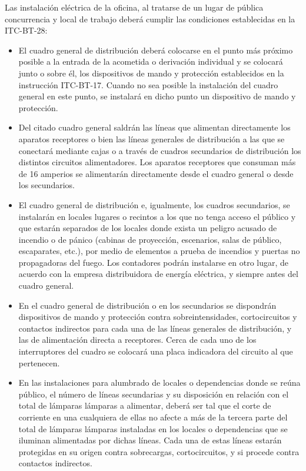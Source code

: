 Las instalación eléctrica de la oficina, al tratarse de un lugar de pública concurrencia y local de trabajo deberá cumplir las condiciones establecidas en la ITC-BT-28: \\

\begin{itemize}
\item El cuadro general de distribución deberá colocarse en el punto más próximo posible a la entrada de la acometida o derivación individual y se colocará junto o sobre él, los dispositivos de mando y protección establecidos en la instrucción ITC-BT-17. Cuando no sea posible la instalación del cuadro general en este punto, se instalará en dicho punto un dispositivo de mando y protección.\\

\item Del citado cuadro general saldrán las líneas que alimentan directamente los aparatos receptores o bien las líneas generales de distribución a las que se conectará mediante cajas o a través de cuadros secundarios de distribución los distintos circuitos alimentadores. Los aparatos receptores que consuman más de 16 amperios se alimentarán directamente desde el cuadro general o desde los secundarios.

\item El cuadro general de distribución e, igualmente, los cuadros secundarios, se instalarán en locales lugares o recintos a los que no tenga acceso el público y que estarán separados de los locales donde exista un peligro acusado de incendio o de pánico (cabinas de proyección, escenarios, salas de público, escaparates, etc.), por medio de elementos a prueba de incendios y puertas no propagadoras del fuego. Los contadores podrán instalarse en otro lugar, de acuerdo con la empresa distribuidora de energía eléctrica, y siempre antes del cuadro general.

\item En el cuadro general de distribución o en los secundarios se dispondrán dispositivos de mando y protección contra sobreintensidades, cortocircuitos y contactos indirectos para cada una de las líneas generales de distribución, y las de alimentación directa a receptores. Cerca de cada uno de los interruptores del cuadro se colocará una placa indicadora del circuito al que pertenecen.

\item En las instalaciones para alumbrado de locales o dependencias donde se reúna público, el número de líneas secundarias y su disposición en relación con el total de lámparas lámparas a alimentar, deberá ser tal que el corte de corriente en una cualquiera de ellas no afecte a más de la tercera parte del total de lámparas lámparas instaladas en los locales o dependencias que se iluminan alimentadas por dichas líneas. Cada una de estas líneas estarán protegidas en su origen contra sobrecargas, cortocircuitos, y si procede contra contactos indirectos.

\end{itemize}


